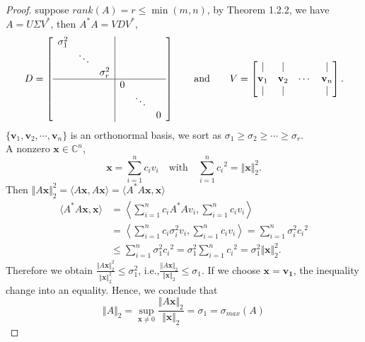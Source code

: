 \documentclass[12pt]{article}
\begin{document}
\begin{proof}
    suppose $rank(A)=r \leq \min{(m,n)}$, by Theorem 1.2.2, we have $A=U \Sigma V^*$, then $A^*A=VDV^*$, 
    \[ D =
    \left[\begin{array}{ccc|ccc}
    \sigma_1^2& & & & & \\
         &\ddots& & & & \\
          & &\sigma_r^2& & & \\ \hline
           & & &0& & \\
            & & & &\ddots& \\
             & & & & &0
    \end{array}
    \right]
    \qquad \text{and} \qquad
    V = 
    \begin{bmatrix}
        | & | &  & | \\
        \mathbf{v}_1 & \mathbf{v}_2 & \cdots & \mathbf{v}_n \\
        | & | &  & |
    \end{bmatrix}.
    \]
    $\{\mathbf{v}_1,\mathbf{v}_2,\cdots ,\mathbf{v}_n\}$ is an orthonormal basis, we sort as $\sigma_1 \geq \sigma_2 \geq \cdots \geq \sigma_r$.\\
    A nonzero $\mathbf{x} \in \mathbb{C}^n$, 
    \[\mathbf{x}=\sum_{i=1}^n{c_iv_i} \quad \text{with}\quad \sum_{i=1}^n{c_i}^2=\Vert \mathbf{x} \Vert_2^2.\]
    Then $\Vert A\mathbf{x} \Vert_2^2=\langle A\mathbf{x},A\mathbf{x}\rangle=\langle A^*A\mathbf{x},\mathbf{x}\rangle$
    \begin{align*}
        \langle A^*A\mathbf{x},\mathbf{x}\rangle
        &=\left\langle\sum_{i=1}^n{c_iA^*Av_i},\sum_{i=1}^n{c_iv_i}\right\rangle\\
        &=\left\langle\sum_{i=1}^n{c_i\sigma_i^2 v_i},\sum_{i=1}^n{c_iv_i}\right\rangle=\sum_{i=1}^n{\sigma_i^2}{c_i}^2\\
        &\leq  \sum_{i=1}^n{\sigma_1^2}{c_i}^2=\sigma_1^2 \sum_{i=1}^n{c_i}^2=\sigma_1^2\Vert \mathbf{x} \Vert_2^2.
    \end{align*}
    Therefore we obtain $\frac{\Vert A\mathbf{x} \Vert_2^2}{\Vert \mathbf{x} \Vert_2^2} \leq \sigma_1^2$, i.e.,$\frac{\Vert A\mathbf{x} \Vert_2}{\Vert \mathbf{x} \Vert_2} \leq \sigma_1$. If we choose $\mathbf{x}=\mathbf{v_1}$, the inequality change into an equality. Hence, we conclude that
    \[\Vert A \Vert_2=\sup_{\mathbf{x} \neq 0}\frac{\Vert A\mathbf{x} \Vert_2}{\Vert \mathbf{x} \Vert_2}=\sigma_1=\sigma_{max}(A)\]    
\end{proof}
\end{document}
